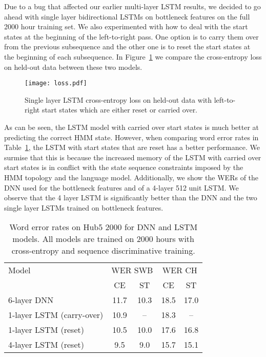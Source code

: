 \documentclass[a4paper]{article}
\begin{document}
Due to a bug that affected our earlier multi-layer LSTM results, we
decided to go ahead with single layer bidirectional LSTMs on
bottleneck features on the full 2000 hour training set. We also
experimented with how to deal with the start states at the beginning
of the left-to-right pass. One option is to carry them over from the
previous subsequence and the other one is to reset the start states at
the beginning of each subsequence.  In Figure~\ref{fig2} we compare
the cross-entropy loss on held-out data between these two models.

\begin{figure}[htpb!]
\centerline{\texttt{[image: loss.pdf]}}
\caption{\label{fig2}  Single layer LSTM cross-entropy loss on held-out data with left-to-right start states which are either reset or carried over.}
\end{figure}

As can be seen, the LSTM model with carried over start states is much
better at predicting the correct HMM state. However, when comparing
word error rates in Table~\ref{lstm2}, the LSTM with start states that
are reset has a better performance. We surmise that this is because
the increased memory of the LSTM with carried over start states is in
conflict with the state sequence constraints imposed by the HMM
topology and the language model.  Additionally, we show the WERs of
the DNN used for the bottleneck features and of a 4-layer 512 unit
LSTM. We observe that the 4 layer LSTM is significantly better than
the DNN and the two single layer LSTMs trained on bottleneck features.

\begin{table}[htpb!]
\begin{center}
\begin{tabular}{|l|c|c|c|c|} \hline
    Model & \multicolumn{2}{|c|}{WER SWB} & \multicolumn{2}{|c|}{WER CH} \\ \cline{2-5}
                        & CE   & ST   & CE   & ST     \\ \hline
6-layer DNN             & 11.7 & 10.3 & 18.5 & 17.0   \\ \hline
1-layer LSTM (carry-over) & 10.9 & --   & 18.3 & --     \\ \hline
1-layer LSTM (reset)      & 10.5 & 10.0 & 17.6 & 16.8   \\ \hline
4-layer LSTM (reset)      & 9.5  & 9.0  & 15.7 & 15.1   \\ \hline
\end{tabular}
\end{center}
\caption{\label{lstm2}
Word error rates on Hub5 2000 for DNN and LSTM models. All models are trained on 2000 hours with cross-entropy and sequence discriminative training.}
\end{table}
\end{document}
